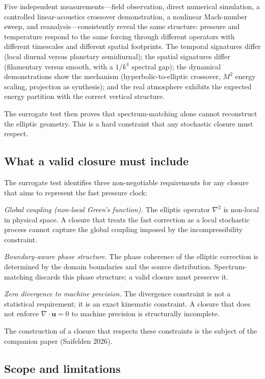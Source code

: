 \documentclass[11pt]{article}
\begin{document}
Five independent measurements---field observation, direct numerical simulation, a controlled linear-acoustics crossover demonstration, a nonlinear Mach-number sweep, and reanalysis---consistently reveal the same structure: pressure and temperature respond to the same forcing through different operators with different timescales and different spatial footprints. The temporal signatures differ (local diurnal versus planetary semidiurnal); the spatial signatures differ (filamentary versus smooth, with a $1/k^4$ spectral gap); the dynamical demonstrations show the mechanism (hyperbolic-to-elliptic crossover, $M^2$ energy scaling, projection as synthesis); and the real atmosphere exhibits the expected energy partition with the correct vertical structure.

The surrogate test then proves that spectrum-matching alone cannot reconstruct the elliptic geometry. This is a hard constraint that any stochastic closure must respect.

\subsection{What a valid closure must include}

The surrogate test identifies three non-negotiable requirements for any closure that aims to represent the fast pressure clock:

\emph{Global coupling (non-local Green's function).} The elliptic operator $\nabla^2$ is non-local in physical space. A closure that treats the fast correction as a local stochastic process cannot capture the global coupling imposed by the incompressibility constraint.

\emph{Boundary-aware phase structure.} The phase coherence of the elliptic correction is determined by the domain boundaries and the source distribution. Spectrum-matching discards this phase structure; a valid closure must preserve it.

\emph{Zero divergence to machine precision.} The divergence constraint is not a statistical requirement; it is an exact kinematic constraint. A closure that does not enforce $\nabla\cdot\mathbf{u} = 0$ to machine precision is structurally incomplete.

The construction of a closure that respects these constraints is the subject of the companion paper (Saifelden 2026).

\subsection{Scope and limitations}
\label{sec:scope}
\end{document}
